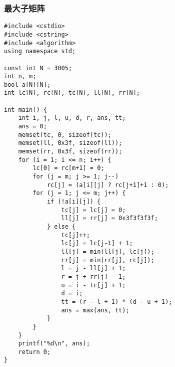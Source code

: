 \subsubsection{最大子矩阵}
\begin{verbatim}
#include <cstdio>
#include <cstring>
#include <algorithm>
using namespace std;

const int N = 3005;
int n, m;
bool a[N][N];
int lc[N], rc[N], tc[N], ll[N], rr[N];

int main() {
    int i, j, l, u, d, r, ans, tt;
    ans = 0;
    memset(tc, 0, sizeof(tc));
    memset(ll, 0x3f, sizeof(ll));
    memset(rr, 0x3f, sizeof(rr));
    for (i = 1; i <= n; i++) {
        lc[0] = rc[m+1] = 0;
        for (j = m; j >= 1; j--)
            rc[j] = (a[i][j] ? rc[j+1]+1 : 0);
        for (j = 1; j <= m; j++) {
            if (!a[i][j]) {
                tc[j] = lc[j] = 0;
                ll[j] = rr[j] = 0x3f3f3f3f;
            } else {
                tc[j]++;
                lc[j] = lc[j-1] + 1;
                ll[j] = min(ll[j], lc[j]);
                rr[j] = min(rr[j], rc[j]);
                l = j - ll[j] + 1;
                r = j + rr[j] - 1;
                u = i - tc[j] + 1;
                d = i;
                tt = (r - l + 1) * (d - u + 1);
                ans = max(ans, tt);
            }
        }
    }
    printf("%d\n", ans);
    return 0;
}
\end{verbatim}
